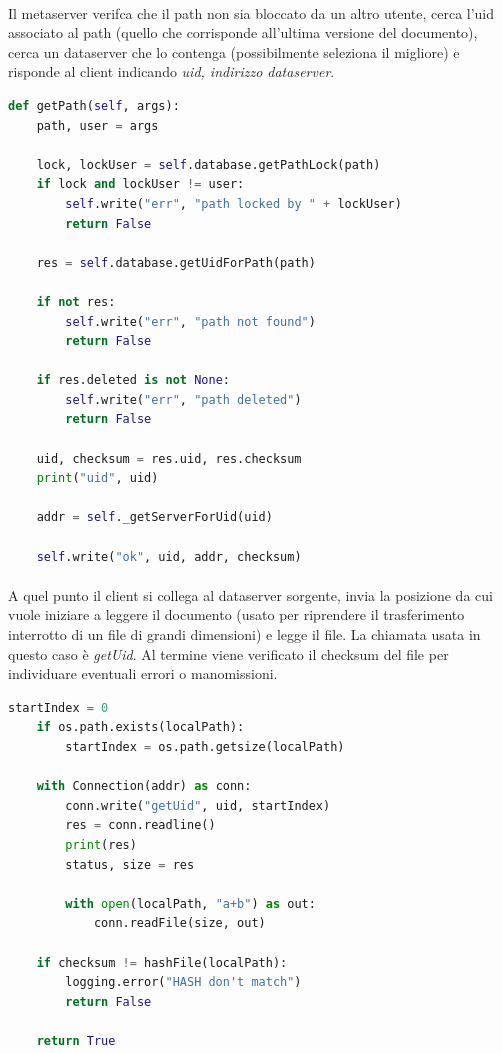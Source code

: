 \documentclass{article}
\begin{document}
\paragraph{} Il metaserver verifca che il path non sia bloccato da un altro utente, cerca l'uid associato al path (quello che corrisponde all'ultima versione del documento), cerca un dataserver che lo contenga (possibilmente seleziona il migliore) e risponde al client indicando \emph{uid, indirizzo dataserver}.

\begin{lstlisting}[language=Python, title=Metaserver]
def getPath(self, args):
    path, user = args

    lock, lockUser = self.database.getPathLock(path)
    if lock and lockUser != user:
        self.write("err", "path locked by " + lockUser)
        return False

    res = self.database.getUidForPath(path)

    if not res:
        self.write("err", "path not found")
        return False

    if res.deleted is not None:
        self.write("err", "path deleted")
        return False

    uid, checksum = res.uid, res.checksum
    print("uid", uid)

    addr = self._getServerForUid(uid)

    self.write("ok", uid, addr, checksum)
\end{lstlisting}

\paragraph{} A quel punto il client si collega al dataserver sorgente, invia la posizione da cui vuole iniziare a leggere il documento (usato per riprendere il trasferimento interrotto di un file di grandi dimensioni) e legge il file. La chiamata usata in questo caso è \emph{getUid}. Al termine viene verificato il checksum del file per individuare eventuali errori o manomissioni. 

\begin{lstlisting}[language=Python, title=Client]
    startIndex = 0
    if os.path.exists(localPath):
        startIndex = os.path.getsize(localPath)

    with Connection(addr) as conn:
        conn.write("getUid", uid, startIndex)
        res = conn.readline()
        print(res)
        status, size = res

        with open(localPath, "a+b") as out:
            conn.readFile(size, out)

    if checksum != hashFile(localPath):
        logging.error("HASH don't match")
        return False

    return True
\end{lstlisting}
\end{document}

